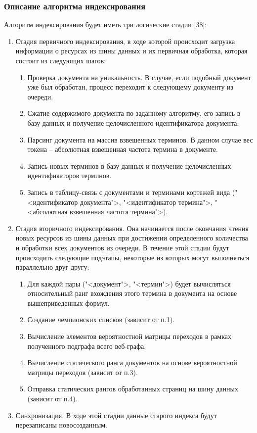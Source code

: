 \subsubsection{Описание алгоритма индексирования}

Алгоритм индексирования будет иметь три логические стадии [38]:
\begin{enumerate}
\item Стадия первичного индексирования, в ходе которой происходит загрузка информации о ресурсах из шины данных и их первичная обработка, которая состоит из следующих шагов:
\begin{enumerate}
\item Проверка документа на уникальность. В случае, если подобный документ уже был обработан, процесс переходит к следующему документу из очереди.
\item Сжатие содержимого документа по заданному алгоритму, его запись в базу данных и получение целочисленного идентификатора документа.
\item Парсинг документа на массив взвешенных терминов. В данном случае вес токена -- абсолютная взвешенная частота термина в документе.
\item Запись новых терминов в базу данных и получение целочисленных идентификаторов терминов.
\item Запись в таблицу-связь с документами и терминами кортежей вида ("<идентификатор документа">, "<идентификатор термина">, "<абсолютная взвешенная частота термина">).
\end{enumerate}
\item Стадия вторичного индексирования. Она начинается после окончания чтения новых ресурсов из шины данных при достижении определенного количества и обработки всех документов из очереди. В течение этой стадии будут происходить следующие подэтапы, некоторые из которых могут выполняться параллельно друг другу:
\begin{enumerate}
\item Для каждой пары ("<документ">, "<термин">) будет вычисляться относительный ранг вхождения этого термина в документа на основе вышеприведенных формул.
\item Создание чемпионских списков (зависит от п.1).
\item Вычисление элементов вероятностной матрицы переходов в рамках полученного подграфа всего веб-графа.
\item Вычисление статического ранга документов на основе вероятностной матрицы переходов (зависит от п.3).
\item Отправка статических рангов обработанных страниц на шину данных (зависит от п.4).
\end{enumerate}
\item Синхронизация. В ходе этой стадии данные старого индекса будут перезаписаны новосозданным.
\end{enumerate}

